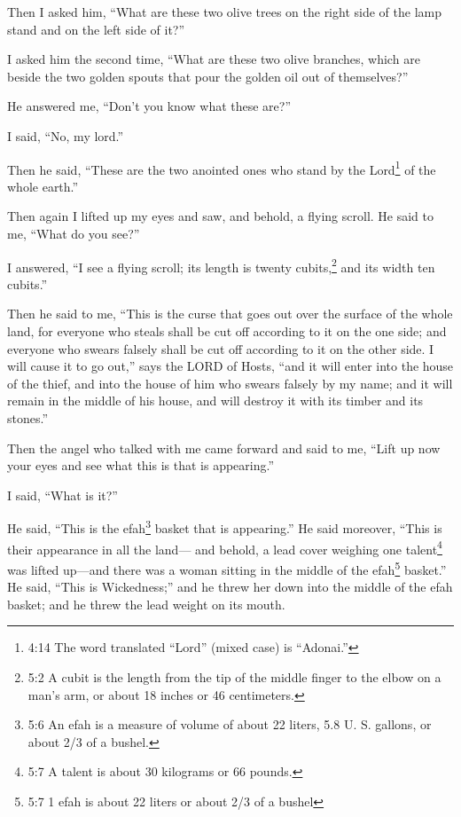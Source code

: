 \myverse{}Then I asked him, “What are these two olive trees on the right
side of the lamp stand and on the left side of it?”

\myverse{}I asked him the second time, “What are these two olive branches,
which are beside the two golden spouts that pour the golden oil out of themselves?”

\myverse{}He answered me, “Don’t you know what these are?”

I said, “No, my lord.”

\myverse{}Then he said, “These are the two anointed ones who stand by the
Lord\footnote{4:14 The word translated “Lord” (mixed case) is “Adonai.”} of the whole earth.”


\mychapter{} \myverse*{}Then again I lifted up my eyes and saw, and behold, a flying scroll.
\myverse{}He said to me, “What do you see?”

I answered, “I see a flying scroll; its length is twenty cubits,\footnote{5:2 A cubit is the length from the tip of the middle finger to the elbow on a man’s arm, or about
	18 inches or 46 centimeters.} and its width ten cubits.”

\myverse{}Then he said to me, “This is the curse that goes out over the surface
of the whole land, for everyone who steals shall be cut off according to it on the one side; and everyone
who swears falsely shall be cut off according to it on the other side.
\myverse{}I will cause it to go out,” says the LORD of Hosts, “and it will enter into
the house of the thief, and into the house of him who swears falsely by my name; and it will remain in
the middle of his house, and will destroy it with its timber and its stones.”

\myverse{}Then the angel who talked with me came forward and said to me,
“Lift up now your eyes and see what this is that is appearing.”

\myverse{}I said, “What is it?”

He said, “This is the efah\footnote{5:6 An efah is a measure of volume of about 22 liters, 5.8 U. S. gallons, or about 2/3 of a bushel.
} basket that is appearing.” He said moreover, “This is their appearance in all the land—
\myverse{}and behold, a lead cover weighing one talent\footnote{5:7 A talent is about 30 kilograms or 66 pounds.} was lifted up—and there was a woman sitting
in the middle of the efah\footnote{5:7 1 efah is about 22 liters or about 2/3 of a bushel} basket.”
\myverse{}He said, “This is Wickedness;” and he threw her down into the middle of the
efah basket; and he threw the lead weight on its mouth.


